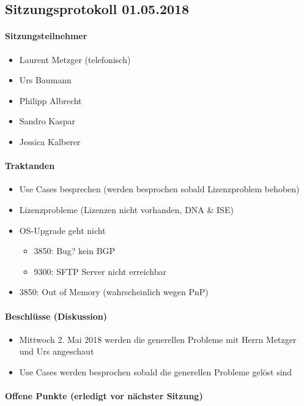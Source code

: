 \newpage



\subsection{Sitzungsprotokoll 01.05.2018}

\paragraph{Sitzungsteilnehmer}
\begin{itemize}	
	\item Laurent Metzger (telefonisch)
	\item Urs Baumann
	\item Philipp Albrecht
	\item Sandro Kaspar
	\item Jessica Kalberer
\end{itemize}

\paragraph{Traktanden}
\begin{itemize}	
	\item Use Cases besprechen (werden besprochen sobald Lizenzproblem behoben)
	\item Lizenzprobleme (Lizenzen nicht vorhanden, DNA \& ISE)
	\item OS-Upgrade geht nicht
	\begin{itemize}
		\item 3850: Bug? kein BGP
		\item 9300: SFTP Server nicht erreichbar
	\end{itemize} 
	\item 3850: Out of Memory (wahrscheinlich wegen PnP)
\end{itemize}

\paragraph{Beschlüsse (Diskussion)}
\begin{itemize}	
	\item Mittwoch 2. Mai 2018 werden die generellen Probleme mit Herrn Metzger und Urs angeschaut
	\item Use Cases werden besprochen sobald die generellen Probleme gelöst sind
\end{itemize}

\paragraph{Offene Punkte (erledigt vor nächster Sitzung)} \mbox{}


